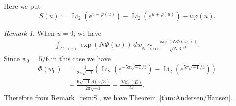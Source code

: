 \documentclass[a4paper]{amsart}
\theoremstyle{plain}
\theoremstyle{definition}
\theoremstyle{remark}
\newtheorem{rem}[thm]{Remark}
\newcommand{\Vol}{\operatorname{Vol}}
\newcommand{\Li}{\operatorname{Li}}
\numberwithin{equation}{section}
\begin{document}
Here we put
\begin{equation*}
  S(u)
  :=
  \Li_2\left(e^{u-\varphi(u)}\right)
  -
  \Li_2\left(e^{u+\varphi(u)}\right)
  -
  u\varphi(u).
\end{equation*}
\begin{rem}
When $u=0$, we have
\begin{equation*}
\begin{split}
  \int_{C_{-}(\varepsilon)}\exp(N\Phi(w))\,dw
  \underset{N\to\infty}{\sim}
  \frac{\exp(N\Phi(w_0))}
  {\sqrt{N}3^{1/4}}.
\end{split}
\end{equation*}
Since $w_0=5/6$ in this case we have
\begin{equation*}
\begin{split}
  \Phi(w_0)
  &=
  \frac{1}{2\pi\sqrt{-1}}
  \left(
    \Li_2(e^{-5\pi\sqrt{-1}/3})-\Li_2(e^{5\pi\sqrt{-1}/3})
  \right)
  \\
  &=
  \frac{6\sqrt{-1}\Lambda(\pi/3)}{2\pi\sqrt{-1}}
  =
  \frac{\Vol(E)}{2\pi}.
\end{split}
\end{equation*}
Therefore from Remark~\ref{rem:S}, we have Theorem~\ref{thm:Andersen/Hansen}.
\end{rem}

\end{document}
